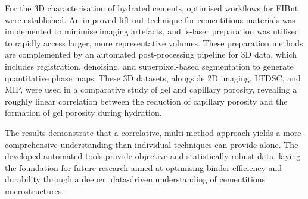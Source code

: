 For the 3D characterisation of hydrated cements, optimised workflows for \acs*{FIBnt} were established.
An improved lift-out technique for cementitious materials was implemented to minimise imaging artefacts, and \acl*{fs-laser} preparation was utilised to rapidly access larger, more representative volumes.
These preparation methods are complemented by an automated post-processing pipeline for 3D data, which includes registration, denoising, and superpixel-based segmentation to generate quantitative phase maps.
These 3D datasets, alongside 2D imaging, \acs*{LTDSC}, and \acl*{MIP}, were used in a comparative study of gel and capillary porosity, revealing a roughly linear correlation between the reduction of capillary porosity and the formation of gel porosity during hydration.

The results demonstrate that a correlative, multi-method approach yields a more comprehensive understanding than individual techniques can provide alone.
The developed automated tools provide objective and statistically robust data, laying the foundation for future research aimed at optimising binder efficiency and durability through a deeper, data-driven understanding of cementitious microstructures.